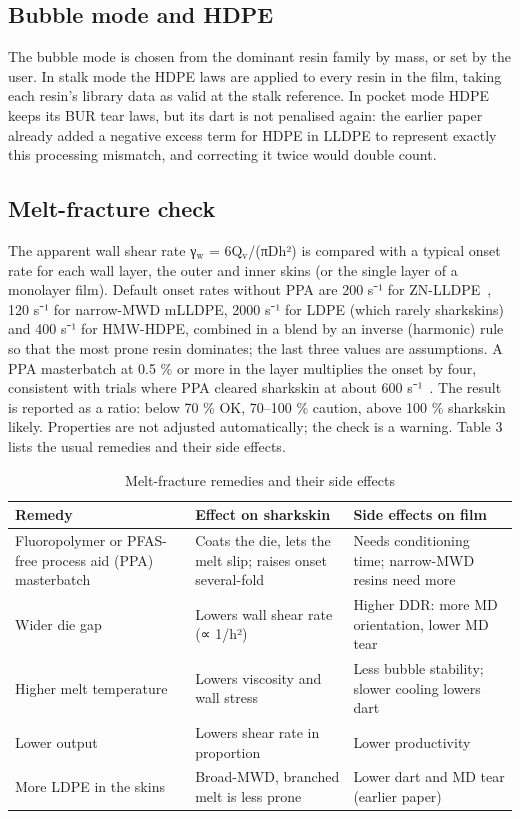 \documentclass[conference,a4paper]{IEEEtran}
\begin{document}
\subsection{Bubble mode and HDPE}

The bubble mode is chosen from the dominant resin family by mass, or set by the user. In stalk mode the HDPE laws are applied to every resin in the film, taking each resin's library data as valid at the stalk reference. In pocket mode HDPE keeps its BUR tear laws, but its dart is not penalised again: the earlier paper already added a negative excess term for HDPE in LLDPE to represent exactly this processing mismatch, and correcting it twice would double count.

\subsection{Melt-fracture check}

The apparent wall shear rate γ$_{\mathrm{w}}$ = 6Q$_{\mathrm{v}}$/(πDh²) is compared with a typical onset rate for each wall layer, the outer and inner skins (or the single layer of a monolayer film). Default onset rates without PPA are 200 s⁻¹ for ZN-LLDPE~\cite{r10}, 120 s⁻¹ for narrow-MWD mLLDPE, 2000 s⁻¹ for LDPE (which rarely sharkskins) and 400 s⁻¹ for HMW-HDPE, combined in a blend by an inverse (harmonic) rule so that the most prone resin dominates; the last three values are assumptions. A PPA masterbatch at 0.5 \% or more in the layer multiplies the onset by four, consistent with trials where PPA cleared sharkskin at about 600 s⁻¹~\cite{r10}. The result is reported as a ratio: below 70 \% OK, 70–100 \% caution, above 100 \% sharkskin likely. Properties are not adjusted automatically; the check is a warning. Table 3 lists the usual remedies and their side effects.

\begin{table}[!t]
\caption{Melt-fracture remedies and their side effects}
\label{tab:mfrem}
\centering\scriptsize
\begin{tabularx}{\columnwidth}{>{\raggedright\arraybackslash\hsize=0.947\hsize}X>{\raggedright\arraybackslash\hsize=1.026\hsize}X>{\raggedright\arraybackslash\hsize=1.026\hsize}X}
\toprule
\textbf{Remedy} & \textbf{Effect on sharkskin} & \textbf{Side effects on film} \\
\midrule
Fluoropolymer or PFAS-free process aid (PPA) masterbatch & Coats the die, lets the melt slip; raises onset several-fold~\cite{r10,r15} & Needs conditioning time; narrow-MWD resins need more~\cite{r10} \\
Wider die gap & Lowers wall shear rate (∝ 1/h²) & Higher DDR: more MD orientation, lower MD tear~\cite{r5,r12} \\
Higher melt temperature & Lowers viscosity and wall stress & Less bubble stability; slower cooling lowers dart~\cite{r4} \\
Lower output & Lowers shear rate in proportion & Lower productivity \\
More LDPE in the skins & Broad-MWD, branched melt is less prone & Lower dart and MD tear (earlier paper) \\
\bottomrule
\end{tabularx}
\end{table}
\end{document}
